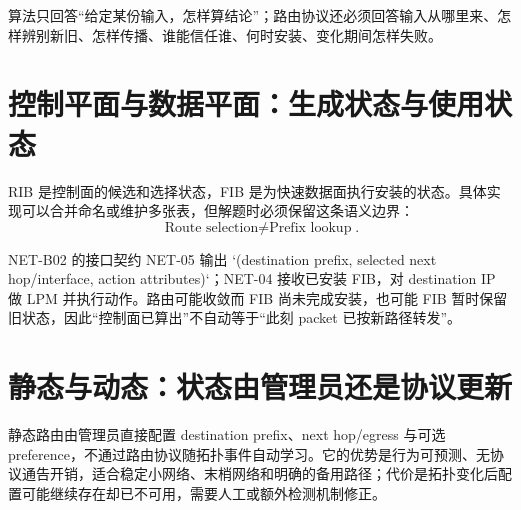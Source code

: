 \documentclass[11pt,a4paper]{ctexart}
\begin{document}
算法只回答“给定某份输入，怎样算结论”；路由协议还必须回答输入从哪里来、怎样辨别新旧、怎样传播、谁能信任谁、何时安装、变化期间怎样失败。

\section{控制平面与数据平面：生成状态与使用状态}

\begin{center}
\end{center}

RIB 是控制面的候选和选择状态，FIB 是为快速数据面执行安装的状态。具体实现可以合并命名或维护多张表，但解题时必须保留这条语义边界：
\[
\boxed{\text{Route selection}\ne\text{Prefix lookup}}.
\]

\begin{methodbox}{NET-B02 的接口契约}
NET-05 输出 `(destination prefix, selected next hop/interface, action attributes)`；NET-04 接收已安装 FIB，对 destination IP 做 LPM 并执行动作。路由可能收敛而 FIB 尚未完成安装，也可能 FIB 暂时保留旧状态，因此“控制面已算出”不自动等于“此刻 packet 已按新路径转发”。
\end{methodbox}

\section{静态与动态：状态由管理员还是协议更新}

静态路由由管理员直接配置 destination prefix、next hop/egress 与可选 preference，不通过路由协议随拓扑事件自动学习。它的优势是行为可预测、无协议通告开销，适合稳定小网络、末梢网络和明确的备用路径；代价是拓扑变化后配置可能继续存在却已不可用，需要人工或额外检测机制修正。
\end{document}
